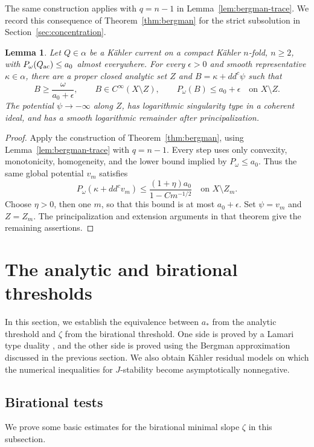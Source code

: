 \documentclass[reqno]{amsart}
\numberwithin{equation}{section}
\newtheorem{lemma}[theorem]{Lemma}
\theoremstyle{definition}
\begin{document}
The same construction applies with $q=n-1$ in
Lemma~\ref{lem:bergman-trace}. We record this consequence
of Theorem~\ref{thm:bergman} for the strict
subsolution in Section~\ref{sec:concentration}.
\begin{lemma}\label{lem:partial-trace}
Let $Q\in\alpha$ be a K\"ahler current on a compact K\"ahler $n$-fold, $n\ge2$, with $P_\omega(Q_{\rm ac})\le a_0$ almost everywhere. For every $\epsilon>0$ and smooth representative $\kappa\in\alpha$, there are a proper closed analytic set $Z$ and $B=\kappa+dd^c\psi$ such that
\[
 B\ge\frac{\omega}{a_0+\epsilon},\qquad
 B\in C^\infty(X\setminus Z),\qquad
 P_\omega(B)\le a_0+\epsilon\quad\text{on }X\setminus Z.
\]
The potential $\psi\to-\infty$ along $Z$, has logarithmic singularity type in a coherent ideal, and has a smooth logarithmic remainder after principalization.
\end{lemma}
\begin{proof}
Apply the construction of Theorem~\ref{thm:bergman}, using Lemma~\ref{lem:bergman-trace} with $q=n-1$. Every step uses only convexity, monotonicity, homogeneity, and the lower bound implied by $P_\omega\le a_0$. Thus the same global potential $v_m$ satisfies
\[
 P_\omega(\kappa+dd^cv_m)\le\frac{(1+\eta)a_0}{1-Cm^{-1/2}}
 \quad\text{on }X\setminus Z_m.
\]
Choose $\eta>0$, then one $m$, so that this bound is at most $a_0+\epsilon$. Set $\psi=v_m$ and $Z=Z_m$. The principalization and extension arguments in that theorem give the remaining assertions.
\end{proof}

\section{The analytic and birational thresholds}\label{sec:threshold}
In this section, we establish the equivalence between $a_*$ from the analytic threshold and $\zeta$ from the birational threshold. One side is proved by a Lamari type duality \cite[Lemma 3.3]{L99}, and the other side is proved using the Bergman approximation discussed in the previous section. We also obtain K\"ahler residual models
on which the numerical inequalities for $J$-stability become asymptotically nonnegative.

\subsection{Birational tests}

We prove some basic estimates for the birational minimal slope $\zeta$ in this subsection. 
\end{document}
